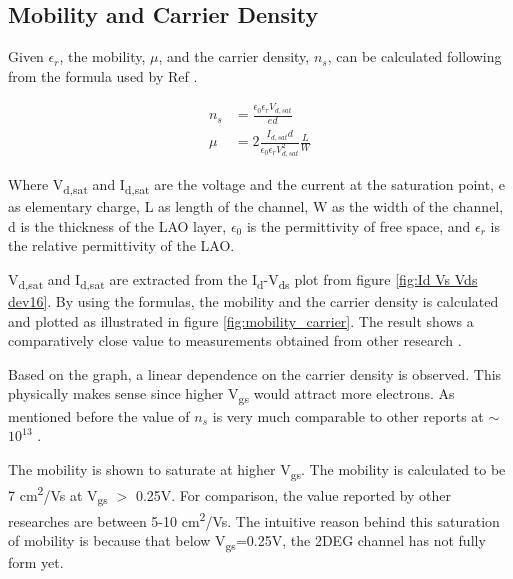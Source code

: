 \documentclass[11pt,a4paper]{report}
\begin{document}
\subsection{Mobility and Carrier Density}
Given $\epsilon_r$, the mobility, $\mu$, and the carrier density, $n_s$, can be calculated following from the formula used by Ref \cite{eerkes_wiel_hilgenkamp_2013}.

\begin{align}
    n_s &= \frac{\epsilon_0 \epsilon_{r} V_{d,sat}}{e d}\\
    \mu &= 2\frac{I_{d,sat}d}{\epsilon_0 \epsilon_{r} V_{d,sat}^2} \frac{L}{W}
\end{align}


Where V\textsubscript{d,sat} and I\textsubscript{d,sat} are the voltage and the current at the saturation point, e as elementary charge, L as length of the channel,  W as the width of the channel, d is the thickness of the LAO layer, $\epsilon_0$ is the permittivity of free space,  and $\epsilon_r$ is the relative permittivity of the LAO.

V\textsubscript{d,sat} and I\textsubscript{d,sat} are extracted from the I\textsubscript{d}-V\textsubscript{ds} plot from figure \ref{fig:Id Vs Vds dev16}. By using the formulas, the mobility and the carrier density is calculated and plotted as illustrated in figure \ref{fig:mobility_carrier}. The result shows a comparatively close value to measurements obtained from other research \cite{thiel_2006,forg_richter_mannhart_2012,Peter_PHD_Thesis,hosoda_hikita_hwang_bell_2013}.

Based on the graph, a linear dependence on the carrier density is observed. This physically makes sense since higher V\textsubscript{gs} would attract more electrons. As mentioned before the value of $n_s$ is very much comparable to other reports at $\sim$$10^{13}$ \cite{caviglia, thiel_2006}. 

The mobility is shown to saturate at higher V\textsubscript{gs}. The mobility is calculated to be 7 \si{cm^2/Vs} at V\textsubscript{gs} $>$ 0.25V. For comparison, the value reported by other researches \cite{thiel_2006, kalabukhov_gunnarsson_2008} are between 5-10 \si{cm^2/Vs}. The intuitive reason behind this saturation of mobility is because that below V\textsubscript{gs}=0.25V, the 2DEG channel has not fully form yet.
\end{document}
